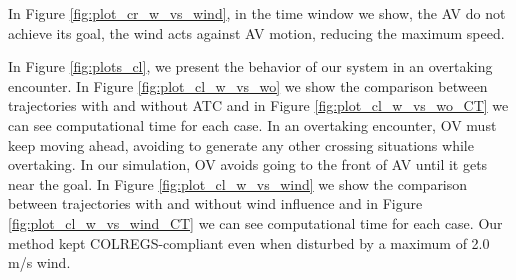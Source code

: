          
        In Figure \ref{fig:plot_cr_w_vs_wind}, in the time window we show, the \ac{AV} do not achieve its goal, the wind acts against \ac{AV} motion, reducing the maximum speed.
        
        In Figure \ref{fig:plots_cl}, we present the behavior of our system in an overtaking encounter.
        In Figure \ref{fig:plot_cl_w_vs_wo} we show the comparison between trajectories with and without \ac{ATC} and in Figure \ref{fig:plot_cl_w_vs_wo_CT} we can see computational time for each case. In an overtaking encounter, \ac{OV} must keep moving ahead, avoiding to generate any other crossing situations while overtaking. In our simulation, \ac{OV} avoids going to the front of \ac{AV} until it gets near the goal.
        In Figure \ref{fig:plot_cl_w_vs_wind} we show the comparison between trajectories with and without wind influence and in Figure \ref{fig:plot_cl_w_vs_wind_CT} we can see computational time for each case. Our method kept \ac{COLREGS}-compliant even when disturbed by a maximum of 2.0 m/s wind.

